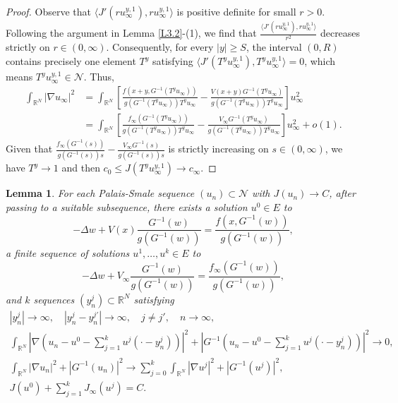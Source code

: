 \documentclass[10pt,a4paper]{amsart}
\numberwithin{equation}{section}
\newtheorem{lemma}[theorem]{Lemma}
\begin{document}
\begin{proof}
Observe that $\langle J'(ru_{\infty}^{y,1}),ru_{\infty}^{y,1}\rangle$ is positive definite for 
small $r>0$. Following the argument in Lemma \ref{L3.2}-(1), we find that 
$\frac{\langle J'(ru_{\infty}^{y,1}),ru_{\infty}^{y,1}\rangle}{r^{2}}$ decreases strictly on 
$r\in(0,\infty)$.
Consequently, for every $|y|\geq S$, the interval $(0, R)$ contains precisely one element 
$T^y$ satisfying   $\langle J'(T^yu_{\infty}^{y,1}),T^yu_{\infty}^{y,1}\rangle=0$, which means 
$T^y u_{\infty}^{y,1}\in\mathcal{N}$. Thus,
\begin{align*}
\int_{\mathbb{R}^{N}} \vert \nabla u_{\infty} \vert^{2} 
&= \int_{\mathbb{R}^{N}} [\frac{f(x+y,G^{-1}(T^{y}u_{\infty}))}{g(G^{-1}(T^{y}u_{\infty}))
 T^{y}u_{\infty}} - \frac{V(x + y)G^{-1}(T^{y}u_{\infty})}{g(G^{-1}(T^{y}u_{\infty}))T^{y}u_{\infty}}]u_{\infty}^{2} \\
&= \int_{\mathbb{R}^{N}} [\frac{f_\infty(G^{-1}(T^{y}u_{\infty}))}{g(G^{-1}(T^{y}u_{\infty}))T^{y}u_{\infty}} - \frac{V_\infty G^{-1}(T^{y}u_{\infty})}{g(G^{-1}(T^{y}u_{\infty}))T^{y}
u_{\infty}}]u_{\infty}^{2} + o(1).
\end{align*} 
Given that $\frac{f_\infty(G^{-1}(s))}{g(G^{-1}(s))s} -\frac{V_\infty G^{-1}(s)}{g(G^{-1}(s))s}$  
is strictly increasing on $s\in(0,\infty)$, we have $T^y\to1$ and then 
$c_0\leq J(T^y u_{\infty}^{y,1})\to c_\infty$.
\end{proof}

\begin{lemma}\label{L3.12}
For each Palais-Smale sequence  $(u_n) \subset \mathcal{N}$ with $J(u_n)\to C$, 
after passing to a suitable subsequence, there exists a solution $u^0 \in E$ to
\[
-\Delta w + V(x)\frac{G^{-1}(w)}{g(G^{-1}(w))}= \frac{f(x,G^{-1}(w))}{g(G^{-1}(w))},
\]
 a finite sequence of solutions $u^1, \ldots, u^k \in E$ to
\[
-\Delta w + V_\infty \frac{G^{-1}(w)}{g(G^{-1}(w))} = \frac{f_\infty(G^{-1}(w))}{g(G^{-1}(w))},
\]
and $k$ sequences $(y_n^j) \subset \mathbb{R}^N$ satisfying
\begin{gather*}
|y_n^j| \to \infty, \quad |y_n^j - y_n^{j'}| \to \infty, \quad j \neq j', \quad n \to \infty, \\
\int_{\mathbb{R}^N} |\nabla (u_n - u^0 - \sum_{j=1}^k u^j(\cdot - y_n^j))|^2 + |G^{-1}(u_n - u^0 - \sum_{j=1}^k u^j(\cdot - y_n^j))|^2\to 0, \\
\int_{\mathbb{R}^N} |\nabla u_n|^2 + |G^{-1}(u_n) |^2
\to \sum_{j=0}^k \int_{\mathbb{R}^N} |\nabla u^j|^2 + |G^{-1}(u^j)|^2, \\
J(u^0) + \sum_{j=1}^k J_\infty (u^j) = C.
\end{gather*}
\end{lemma}
\end{document}
